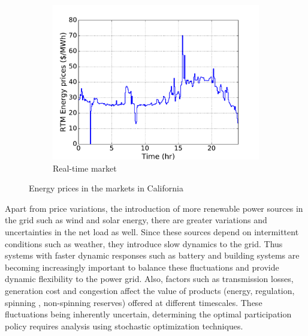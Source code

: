 \documentclass[11pt,twoside]{article}
\begin{document}
\begin{figure}[h!tp]
\begin{subfigure}[b]{0.32\textwidth} \includegraphics[width=\textwidth]{Figures/rtmprices.pdf} \caption{Real-time market}\label{rtmprices}\end{subfigure} \hfill
\caption{Energy prices in the markets in California}\label{eprices}
\end{figure}



Apart from price variations, the introduction of more renewable power sources in the grid such as wind and solar energy, there are greater variations and uncertainties in the net load as well. Since these sources depend on intermittent conditions such as weather, they introduce slow dynamics to the grid. Thus systems with faster dynamic responses such as battery and building systems are becoming increasingly important to balance these fluctuations and provide dynamic flexibility to the power grid. Also, factors such as transmission losses, generation cost and congestion affect the value of products (energy, regulation, spinning , non-spinning reserves) offered at different timescales. These fluctuations being inherently uncertain, determining the optimal participation policy requires analysis using stochastic optimization techniques.
\end{document}
